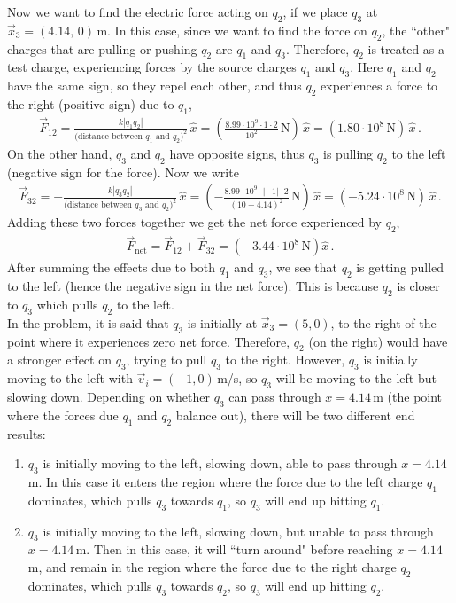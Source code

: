 \documentclass[11pt]{article}
\begin{document}
Now we want to find the electric force acting on $q_2$, if we place $q_3$ at $\vec{x}_3 = (4.14,\,0)$\,m. In this case, since we want to find the force on $q_2$, the ``other" charges that are pulling or pushing $q_2$ are $q_1$ and $q_3$. Therefore, $q_2$ is treated as a test charge, experiencing forces by the source charges $q_1$ and $q_3$. Here $q_1$ and $q_2$ have the same sign, so they repel each other, and thus $q_2$ experiences a force to the right (positive sign) due to $q_1$, 
\begin{align*}
\vec{F}_{12} = \frac{k|q_1q_2|}{(\text{distance between }q_1 \text{ and }q_2\text{)}^2}\,\hat{x} =\left( \frac{8.99 \cdot 10^9\cdot 1 \cdot 2}{10^2}\,\text{N}\right)\,\hat{x} = \left(1.80 \cdot 10^8\,\text{N}\right)\, \hat{x}\,.
\end{align*}
On the other hand, $q_3$ and $q_2$ have opposite signs, thus $q_3$ is pulling $q_2$ to the left (negative sign for the force). Now we write
\begin{align*}
\vec{F}_{32} = -\frac{k|q_3q_2|}{(\text{distance between }q_3 \text{ and }q_2\text{)}^2}\,\hat{x} =\left( -\frac{8.99 \cdot 10^9\cdot |-1| \cdot 2}{(10-4.14)^2}\,\text{N}\right)\,\hat{x} = \left(-5.24 \cdot 10^8\,\text{N}\right)\, \hat{x}\,.
\end{align*} 
Adding these two forces together we get the net force experienced by $q_2$,
\begin{align*}
\vec{F}_{\text{net}} =\vec{F}_{12} + \vec{F}_{32} =\left(-3.44\cdot 10^{8}\,\text{N}\right) \hat{x}\,.
\end{align*}
After summing the effects due to both $q_1$ and $q_3$, we see that  $q_2$ is getting pulled to the left (hence the negative sign in the net force). This is because $q_2$ is closer to $q_3$ which pulls $q_2$ to the left. \\

In the problem, it is said that $q_3$ is initially at $\vec{x}_3 = (5,0)$, to the right of the point where it experiences zero net force. Therefore, $q_2$ (on the right) would have a stronger effect on $q_3$, trying to pull $q_3$ to the right. However, $q_3$ is initially moving to the left with $\vec{v}_i = (-1,0)$\,m/s, so $q_3$ will be moving to the left but slowing down. Depending on whether $q_3$ can pass through $x = 4.14$\,m (the point where the forces due $q_1$ and $q_2$ balance out), there will be two different end results: \\
\begin{enumerate}
\item $q_3$ is initially moving to the left, slowing down, able to pass through $x= 4.14$\,m. In this case it enters the region where the force due to the left charge $q_1$ dominates, which pulls $q_3$ towards $q_1$, so $q_3$ will end up hitting $q_1$.\\
\item $q_3$ is initially moving to the left, slowing down, but unable to pass through $x= 4.14$\,m. Then in this case, it will ``turn around" before reaching $x = 4.14$\,m, and remain in the region where the force due to the right charge $q_2$ dominates, which pulls $q_3$ towards $q_2$, so $q_3$ will end up hitting $q_2$.
\end{enumerate}
\end{document}
